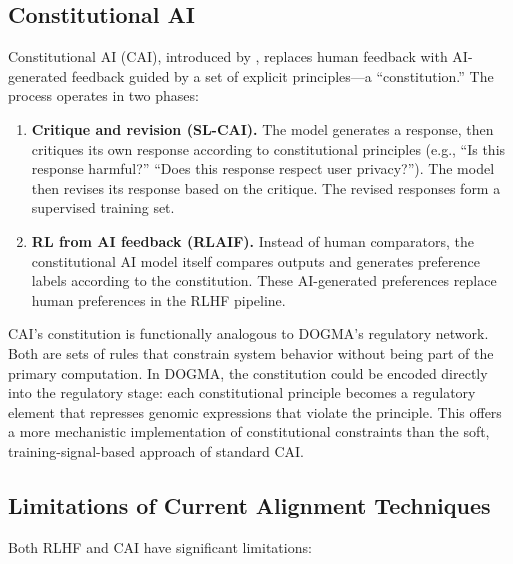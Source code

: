 \subsection{Constitutional AI}

Constitutional AI (CAI), introduced by \citet{bai2022}, replaces human feedback with AI-generated feedback guided by a set of explicit principles---a ``constitution.''
The process operates in two phases:

\begin{enumerate}[leftmargin=1.8em]
  \item \textbf{Critique and revision (SL-CAI).} The model generates a response, then critiques its own response according to constitutional principles (e.g., ``Is this response harmful?'' ``Does this response respect user privacy?'').
  The model then revises its response based on the critique.
  The revised responses form a supervised training set.

  \item \textbf{RL from AI feedback (RLAIF).} Instead of human comparators, the constitutional AI model itself compares outputs and generates preference labels according to the constitution.
  These AI-generated preferences replace human preferences in the RLHF pipeline.
\end{enumerate}

\begin{keyinsight}
CAI's constitution is functionally analogous to DOGMA's regulatory network.
Both are sets of rules that constrain system behavior without being part of the primary computation.
In DOGMA, the constitution could be encoded directly into the regulatory stage: each constitutional principle becomes a regulatory element that represses genomic expressions that violate the principle.
This offers a more mechanistic implementation of constitutional constraints than the soft, training-signal-based approach of standard CAI.
\end{keyinsight}

\subsection{Limitations of Current Alignment Techniques}

Both RLHF and CAI have significant limitations:

